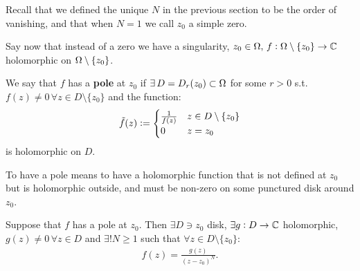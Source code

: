 Recall that we defined the unique $N$ in the previous section to be the order of vanishing, and that when $N=1$ we call $z_0$ a simple zero.


Say now that instead of a zero we have a singularity, $z_0 \in \Omega , \, f: \Omega \setminus \{ z_0 \} \to \mathbb{C}$ holomorphic on $\Omega \setminus \{ z_0 \}$.


\begin{center}
\end{center}



\begin{definition}[Poles]
We say that $f$ has a \textbf{pole} at $z_0$ if $\exists \, D = D_r(z_0) \subset \Omega$ for some $r>0$ s.t. $f(z) \neq 0 \, \forall z \in D \setminus \{ z_0 \}$ and the function:
\begin{align*}
    \Tilde{f}(z) \vcentcolon = \begin{cases} \frac{1}{f(z)} & z \in D \setminus \{ z_0 \} \\ 0 & z = z_0  \end{cases}
\end{align*}
is holomorphic on $D$.

\end{definition}

To have a pole means to have a holomorphic function that is not defined at $z_0$  but is holomorphic outside, and must be non-zero on some punctured disk around $z_0$.



\begin{lemma}\label{lem:pole-lemma}
Suppose that $f$ has a pole at $z_0$. Then $\exists D \ni z_0$ disk, $\exists g: D \to \mathbb{C} $ holomorphic, $g(z) \neq 0 \, \forall z \in D$ and $\exists ! N \geq 1$ such that $\forall z\in D \setminus \{ z_0 \}$:
\begin{align*}
f(z) = \frac{g(z)}{(z-z_0)^N}.
\end{align*}

\end{lemma}

